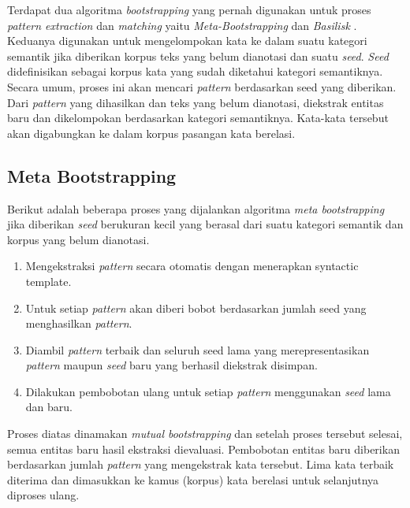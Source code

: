 Terdapat dua algoritma \textit{bootstrapping} yang pernah digunakan untuk proses \textit{pattern extraction} dan \textit{matching} yaitu \textit{Meta-Bootstrapping} dan \textit{Basilisk} \citep{riloff2003learning}. Keduanya digunakan untuk mengelompokan kata ke dalam suatu kategori semantik jika diberikan korpus teks yang belum dianotasi dan suatu \textit{seed}. \textit{Seed} didefinisikan sebagai korpus kata yang sudah diketahui kategori semantiknya. Secara umum, proses ini akan mencari \textit{pattern} berdasarkan seed yang diberikan. Dari \textit{pattern} yang dihasilkan dan teks yang belum dianotasi, diekstrak entitas baru dan dikelompokan berdasarkan kategori semantiknya. Kata-kata tersebut akan digabungkan ke dalam korpus pasangan kata berelasi.

\subsection{Meta Bootstrapping}
Berikut adalah beberapa proses \citep{riloff1999learning} yang dijalankan algoritma \textit{meta bootstrapping} jika diberikan \textit{seed} berukuran kecil yang berasal dari suatu kategori semantik dan korpus yang belum dianotasi.
\begin{enumerate}
  \item Mengekstraksi \textit{pattern} secara otomatis dengan menerapkan syntactic template.
  \item Untuk setiap \textit{pattern} akan diberi bobot berdasarkan jumlah seed yang menghasilkan \textit{pattern}.
  \item Diambil \textit{pattern} terbaik dan seluruh seed lama yang merepresentasikan \textit{pattern} maupun \textit{seed} baru yang berhasil diekstrak disimpan.
  \item Dilakukan pembobotan ulang untuk setiap \textit{pattern} menggunakan \textit{seed} lama dan baru.
\end{enumerate}
Proses diatas dinamakan \textit{mutual bootstrapping} dan setelah proses tersebut selesai, semua entitas baru hasil ekstraksi dievaluasi. Pembobotan entitas baru diberikan berdasarkan jumlah \textit{pattern} yang mengekstrak kata tersebut. Lima kata terbaik diterima dan dimasukkan ke kamus (korpus) kata berelasi untuk selanjutnya diproses ulang.

